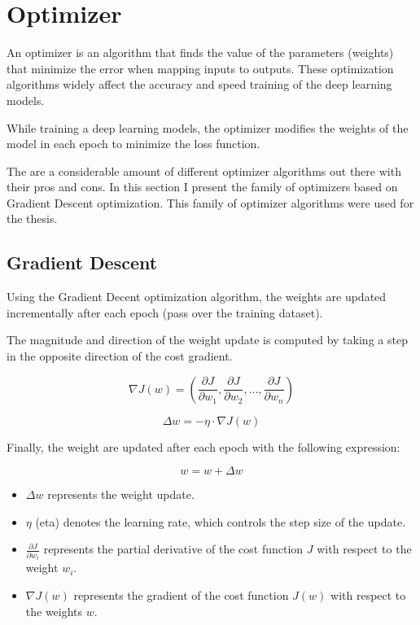 \section{Optimizer}

An optimizer is an algorithm that finds the value of the parameters (weights)
that minimize the error when mapping inputs to outputs. These optimization
algorithms widely affect the accuracy and speed training of the deep learning
models. \newline

While training a deep learning models, the optimizer modifies the weights of
the model in each epoch to minimize the loss function. \newline

The are a considerable amount of different optimizer algorithms out there with
their pros and cons. In this section I present the family of optimizers based
on Gradient Descent optimization. This family of optimizer algorithms were used
for the thesis. \newline

\subsection{Gradient Descent}

Using the Gradient Decent optimization algorithm, the weights are updated
incrementally after each epoch (pass over the training dataset). \newline

The magnitude and direction of the weight update is computed by taking a step
in the opposite direction of the cost gradient.

\[\nabla J(w) = (\frac{\partial J}{\partial w_1}, \frac{\partial J}{\partial w_2}, \ldots, \frac{\partial J}{\partial w_n})\]

\[
  \Delta w = -\eta \cdot \nabla J(w)
\]

Finally, the weight are updated after each epoch with the following expression:

\[
  w = w + \Delta w
\]


\begin{itemize}
  \item \(\Delta w\) represents the weight update.
  \item \(\eta\) (eta) denotes the learning rate, which controls the step size of the update.
  \item  \(\frac{\partial J}{\partial w_i}\) represents the partial derivative of the cost function \(J\) with respect to the weight \(w_i\).
  \item \(\nabla J(w)\) represents the gradient of the cost function \(J(w)\) with respect to the weights \(w\).
\end{itemize}

